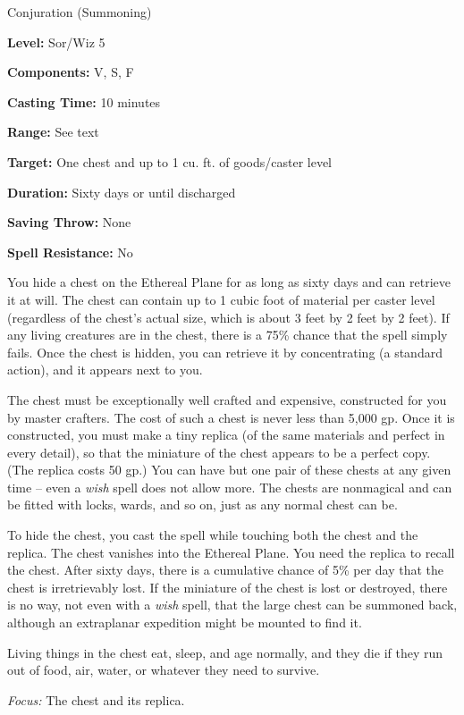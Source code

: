 
Conjuration (Summoning)

\textbf{Level:} Sor/Wiz 5

\textbf{Components:} V, S, F

\textbf{Casting Time:} 10 minutes

\textbf{Range:} See text

\textbf{Target:} One chest and up to 1 cu. ft. of goods/caster level

\textbf{Duration:} Sixty days or until discharged

\textbf{Saving Throw:} None

\textbf{Spell Resistance:} No

You hide a chest on the Ethereal Plane for as long as sixty days and can retrieve 
it at will. The chest can contain up to 1 cubic foot of material per caster level 
(regardless of the chest's actual size, which is about 3 feet by 2 feet by 2 feet). 
If any living creatures are in the chest, there is a 75\% chance that the spell 
simply fails. Once the chest is hidden, you can retrieve it by concentrating (a 
standard action), and it appears next to you.

The chest must be exceptionally well crafted and expensive, constructed for you 
by master crafters. The cost of such a chest is never less than 5,000 gp. Once 
it is constructed, you must make a tiny replica (of the same materials and perfect 
in every detail), so that the miniature of the chest appears to be a perfect copy. 
(The replica costs 50 gp.) You can have but one pair of these chests at any given 
time -- even a \textit{wish} spell does not allow more. The chests are nonmagical 
and can be fitted with locks, wards, and so on, just as any normal chest can be.

To hide the chest, you cast the spell while touching both the chest and the replica. 
The chest vanishes into the Ethereal Plane. You need the replica to recall the 
chest. After sixty days, there is a cumulative chance of 5\% per day that the chest 
is irretrievably lost. If the miniature of the chest is lost or destroyed, there 
is no way, not even with a \textit{wish} spell, that the large chest can be summoned 
back, although an extraplanar expedition might be mounted to find it.

Living things in the chest eat, sleep, and age normally, and they die if they run 
out of food, air, water, or whatever they need to survive.

\textit{Focus:} The chest and its replica.

